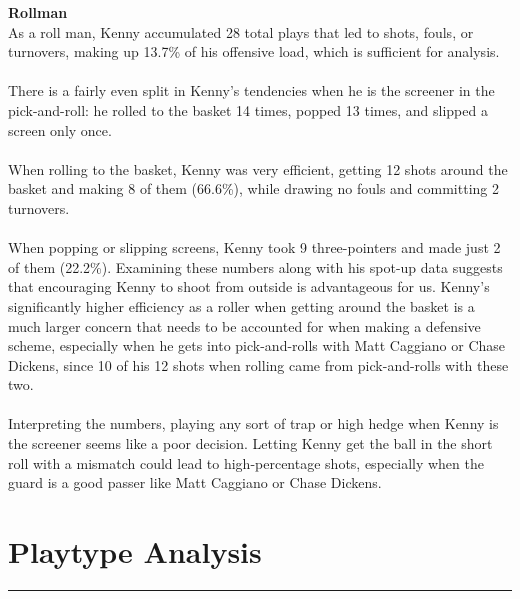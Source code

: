 \documentclass[a4paper,12pt]{article}
\begin{document}
\begin{multicols}{2}
    {\large \noindent \textbf{Rollman}} \\ 
    As a roll man, Kenny accumulated 28 total plays that led to shots, fouls, or turnovers, making up 13.7\% of his offensive load, which is sufficient for analysis. \\ \\
    There is a fairly even split in Kenny's tendencies when he is the screener in the pick-and-roll: he rolled to the basket 14 times, popped 13 times, and slipped a screen only once. \\ \\
    When rolling to the basket, Kenny was very efficient, getting 12 shots around the basket and making 8 of them (66.6\%), while drawing no fouls and committing 2 turnovers. \\ \\
    When popping or slipping screens, Kenny took 9 three-pointers and made just 2 of them (22.2\%). Examining these numbers along with his spot-up data suggests that encouraging Kenny to shoot from outside is advantageous for us. Kenny's significantly higher efficiency as a roller when getting around the basket is a much larger concern that needs to be accounted for when making a defensive scheme, especially when he gets into pick-and-rolls with Matt Caggiano or Chase Dickens, since 10 of his 12 shots when rolling came from pick-and-rolls with these two. \\ \\
    Interpreting the numbers, playing any sort of trap or high hedge when Kenny is the screener seems like a poor decision. Letting Kenny get the ball in the short roll with a mismatch could lead to high-percentage shots, especially when the guard is a good passer like Matt Caggiano or Chase Dickens.


\end{multicols}


\newpage
\section{Playtype Analysis}

\vspace{1em} %
\hrule height 1pt width 1\textwidth %
\vspace{1em} %
\end{document}
